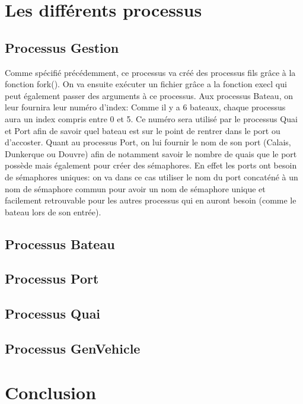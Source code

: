 \documentclass[a4paper, 11pt]{article}
\begin{document}
\section{Les différents processus}
	\subsection{Processus Gestion}
		Comme spécifié précédemment, ce processus va créé des processus fils grâce à la fonction fork(). On va ensuite exécuter un fichier grâce a la fonction execl qui peut également passer des arguments à ce processus. Aux processus Bateau, on leur fournira leur numéro d'index: Comme il y a 6 bateaux, chaque processus aura un index compris entre 0 et 5. Ce numéro sera utilisé par le processus Quai et Port afin de savoir quel bateau est sur le point de rentrer dans le port ou d'accoster. Quant au processus Port, on lui fournir le nom de son port (Calais, Dunkerque ou Douvre) afin de notamment savoir le nombre de quais que le port possède mais également pour créer des sémaphores. En effet les ports ont besoin de sémaphores uniques: on va dans ce cas utiliser le nom du port concaténé à un nom de sémaphore commun pour avoir un nom de sémaphore unique et facilement retrouvable pour les autres processus qui en auront besoin (comme le bateau lors de son entrée).
		
			
	\subsection{Processus Bateau}
	
	\subsection{Processus Port}
	
	\subsection{Processus Quai}
	
	\subsection{Processus GenVehicle}

\section{Conclusion}
\end{document}
